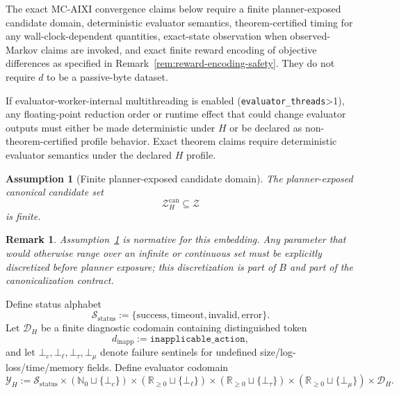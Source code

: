 \documentclass[11pt]{article}
\newtheorem{remark}{Remark}
\newtheorem{assumption}{Assumption}
\begin{document}
The exact MC-AIXI convergence claims below require a finite planner-exposed
candidate domain, deterministic evaluator semantics, theorem-certified timing
for any wall-clock-dependent quantities, exact-state observation when
observed-Markov claims are invoked, and exact finite reward encoding of
objective differences as specified in
Remark~\ref{rem:reward-encoding-safety}. They do not require $d$ to be a
passive-byte dataset.

If evaluator-worker-internal multithreading is enabled
(\texttt{evaluator\_threads}>1), any floating-point reduction order or runtime
effect that could change evaluator outputs must either be made deterministic
under $H$ or be declared as non-theorem-certified profile behavior. Exact
theorem claims require deterministic evaluator semantics under the declared
$H$ profile.

\begin{assumption}[Finite planner-exposed candidate domain]\label{ass:finite-Z}
The planner-exposed canonical candidate set
\[
\mathcal{Z}_H^{\mathrm{can}} \subseteq \mathcal{Z}
\]
is finite.
\end{assumption}

\begin{remark}
Assumption~\ref{ass:finite-Z} is normative for this embedding. Any parameter
that would otherwise range over an infinite or continuous set must be
explicitly discretized before planner exposure; this discretization is part of
$B$ and part of the canonicalization contract.
\end{remark}

Define status alphabet
\[
\mathcal{S}_{\mathrm{status}}
:=
\{\mathrm{success},\mathrm{timeout},\mathrm{invalid},\mathrm{error}\}.
\]
Let $\mathcal{D}_H$ be a finite diagnostic codomain containing distinguished
token
\[
d_{\mathrm{inapp}}:=\texttt{inapplicable\_action},
\]
and let $\bot_c,\bot_\ell,\bot_\tau,\bot_\mu$ denote failure sentinels for
undefined size/log-loss/time/memory fields. Define evaluator codomain
\[
\mathcal{Y}_H
:=
\mathcal{S}_{\mathrm{status}}
\times (\mathbb{N}_0\sqcup\{\bot_c\})
\times (\mathbb{R}_{\ge 0}\sqcup\{\bot_\ell\})
\times (\mathbb{R}_{\ge 0}\sqcup\{\bot_\tau\})
\times (\mathbb{R}_{\ge 0}\sqcup\{\bot_\mu\})
\times \mathcal{D}_H.
\]
\end{document}
